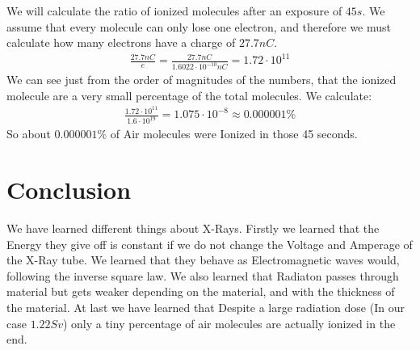 \documentclass[]{scrartcl}
\begin{document}
We will calculate the ratio of ionized molecules after an exposure of $45s$. We assume that every molecule can only lose one electron, and therefore we must calculate how many electrons have a charge of $27.7nC$.
\begin{gather}
	\frac{27.7nC}{e} = \frac{27.7nC}{1.6022\cdot 10^{-10}nC} = 1.72\cdot 10^{11}
\end{gather}
We can see just from the order of magnitudes of the numbers, that the ionized molecule are a very small percentage of the total molecules. We calculate:
\begin{gather}
	\frac{1.72\cdot 10^{11}}{1.6\cdot 10^{19}} = 1.075\cdot 10^{-8} \approx 0.000001\%
\end{gather}
So about $0.000001\%$ of Air molecules were Ionized in those 45 seconds. 

\section{Conclusion}

We have learned different things about X-Rays. Firstly we learned that the Energy they give off is constant if we do not change the Voltage and Amperage of the X-Ray tube. We learned that they behave as Electromagnetic waves would, following the inverse square law. We also learned that Radiaton passes through material but gets weaker depending on the material, and with the thickness of the material. At last we have learned that Despite a large radiation dose (In our case $1.22Sv$) only a tiny percentage of air molecules are actually ionized in the end.
\end{document}
